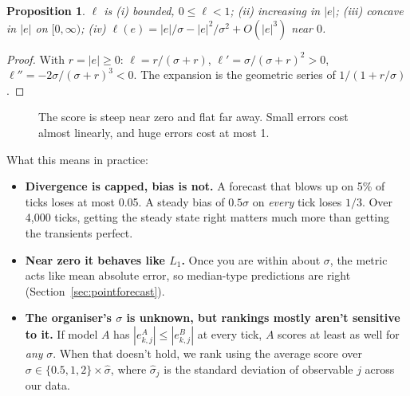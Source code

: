 \documentclass[11pt]{article}
\theoremstyle{plain}
\newtheorem{proposition}[theorem]{Proposition}
\theoremstyle{definition}
\theoremstyle{remark}
\newcommand{\abs}[1]{\left\lvert #1 \right\rvert}
\begin{document}
\begin{proposition}\label{prop:loss}
$\ell$ is (i) bounded, $0\le\ell<1$; (ii) increasing in $\abs e$; (iii) concave in $\abs e$ on $[0,\infty)$; (iv) $\ell(e)=\abs e/\sigma - \abs e^2/\sigma^2+O(\abs e^3)$ near $0$.
\end{proposition}
\begin{proof}
With $r=\abs e\ge0$: $\ell=r/(\sigma+r)$, $\ell'=\sigma/(\sigma+r)^2>0$, $\ell''=-2\sigma/(\sigma+r)^3<0$. The expansion is the geometric series of $1/(1+r/\sigma)$.
\end{proof}

\begin{figure}[h]
\centering
{}
\caption{The score is steep near zero and flat far away. Small errors cost almost linearly, and huge errors cost at most 1.}
\end{figure}

What this means in practice:
\begin{itemize}
\item \textbf{Divergence is capped, bias is not.} A forecast that blows up on 5\% of ticks loses at most 0.05. A steady bias of $0.5\sigma$ on \emph{every} tick loses $1/3$. Over 4,000 ticks, getting the steady state right matters much more than getting the transients perfect.
\item \textbf{Near zero it behaves like $L_1$.} Once you are within about $\sigma$, the metric acts like mean absolute error, so median-type predictions are right (Section~\ref{sec:pointforecast}).
\item \textbf{The organiser's $\sigma$ is unknown, but rankings mostly aren't sensitive to it.} If model $A$ has $\abs{e^A_{k,j}}\le\abs{e^B_{k,j}}$ at every tick, $A$ scores at least as well for \emph{any} $\sigma$. When that doesn't hold, we rank using the average score over $\sigma\in\{0.5,1,2\}\times\hat\sigma$, where $\hat\sigma_j$ is the standard deviation of observable $j$ across our data.
\end{itemize}
\end{document}
